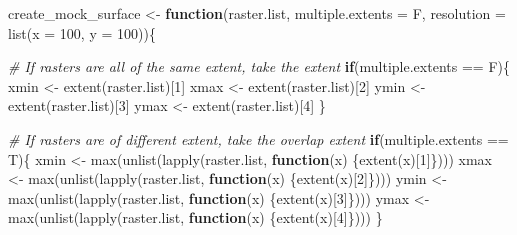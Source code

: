 \documentclass[
]{article}
\newenvironment{Shaded}{\begin{snugshade}}{\end{snugshade}}
\newcommand{\AttributeTok}[1]{\textcolor[rgb]{0.77,0.63,0.00}{#1}}
\newcommand{\CommentTok}[1]{\textcolor[rgb]{0.56,0.35,0.01}{\textit{#1}}}
\newcommand{\ControlFlowTok}[1]{\textcolor[rgb]{0.13,0.29,0.53}{\textbf{#1}}}
\newcommand{\DecValTok}[1]{\textcolor[rgb]{0.00,0.00,0.81}{#1}}
\newcommand{\FunctionTok}[1]{\textcolor[rgb]{0.00,0.00,0.00}{#1}}
\newcommand{\NormalTok}[1]{#1}
\newcommand{\OtherTok}[1]{\textcolor[rgb]{0.56,0.35,0.01}{#1}}
\newcommand{\SpecialCharTok}[1]{\textcolor[rgb]{0.00,0.00,0.00}{#1}}
\begin{document}
\begin{Shaded}
\begin{Highlighting}[]
\NormalTok{create\_mock\_surface }\OtherTok{\textless{}{-}} \ControlFlowTok{function}\NormalTok{(raster.list, }\AttributeTok{multiple.extents =}\NormalTok{ F, }\AttributeTok{resolution =} \FunctionTok{list}\NormalTok{(}\AttributeTok{x =} \DecValTok{100}\NormalTok{, }\AttributeTok{y =} \DecValTok{100}\NormalTok{))\{}
  
  \CommentTok{\# If rasters are all of the same extent, take the extent}
  \ControlFlowTok{if}\NormalTok{(multiple.extents }\SpecialCharTok{==}\NormalTok{ F)\{}
\NormalTok{    xmin }\OtherTok{\textless{}{-}} \FunctionTok{extent}\NormalTok{(raster.list)[}\DecValTok{1}\NormalTok{]}
\NormalTok{    xmax }\OtherTok{\textless{}{-}} \FunctionTok{extent}\NormalTok{(raster.list)[}\DecValTok{2}\NormalTok{]}
\NormalTok{    ymin }\OtherTok{\textless{}{-}} \FunctionTok{extent}\NormalTok{(raster.list)[}\DecValTok{3}\NormalTok{]}
\NormalTok{    ymax }\OtherTok{\textless{}{-}} \FunctionTok{extent}\NormalTok{(raster.list)[}\DecValTok{4}\NormalTok{]}
\NormalTok{  \}}
  
  \CommentTok{\# If rasters are of different extent, take the overlap extent}
  \ControlFlowTok{if}\NormalTok{(multiple.extents }\SpecialCharTok{==}\NormalTok{ T)\{}
\NormalTok{    xmin }\OtherTok{\textless{}{-}} \FunctionTok{max}\NormalTok{(}\FunctionTok{unlist}\NormalTok{(}\FunctionTok{lapply}\NormalTok{(raster.list, }\ControlFlowTok{function}\NormalTok{(x) \{}\FunctionTok{extent}\NormalTok{(x)[}\DecValTok{1}\NormalTok{]\})))}
\NormalTok{    xmax }\OtherTok{\textless{}{-}} \FunctionTok{max}\NormalTok{(}\FunctionTok{unlist}\NormalTok{(}\FunctionTok{lapply}\NormalTok{(raster.list, }\ControlFlowTok{function}\NormalTok{(x) \{}\FunctionTok{extent}\NormalTok{(x)[}\DecValTok{2}\NormalTok{]\})))}
\NormalTok{    ymin }\OtherTok{\textless{}{-}} \FunctionTok{max}\NormalTok{(}\FunctionTok{unlist}\NormalTok{(}\FunctionTok{lapply}\NormalTok{(raster.list, }\ControlFlowTok{function}\NormalTok{(x) \{}\FunctionTok{extent}\NormalTok{(x)[}\DecValTok{3}\NormalTok{]\})))}
\NormalTok{    ymax }\OtherTok{\textless{}{-}} \FunctionTok{max}\NormalTok{(}\FunctionTok{unlist}\NormalTok{(}\FunctionTok{lapply}\NormalTok{(raster.list, }\ControlFlowTok{function}\NormalTok{(x) \{}\FunctionTok{extent}\NormalTok{(x)[}\DecValTok{4}\NormalTok{]\})))}
\NormalTok{  \}}
  

\end{Highlighting}
\end{Shaded}
\end{document}
